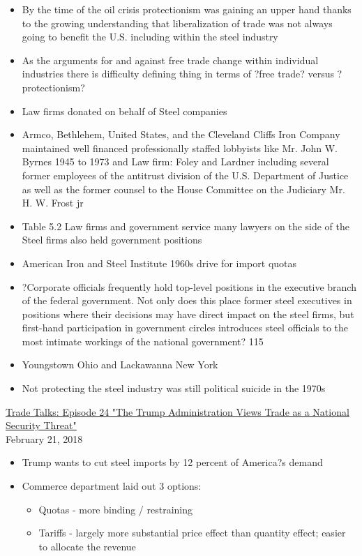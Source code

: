 \documentclass[10pt]{article}
\begin{document}
\begin{itemize}
\begin{itemize}
  \item By the time of the oil crisis protectionism was gaining an upper hand thanks to the growing understanding that liberalization of trade was not always going to benefit the U.S. including within the steel industry
  \item As the arguments for and against free trade change within individual industries there is difficulty defining thing in terms of ?free trade? versus ?protectionism?
  \item Law firms donated on behalf of Steel companies 
  \item Armco, Bethlehem, United States, and the Cleveland Cliffs Iron Company maintained well financed professionally staffed lobbyists like Mr. John W. Byrnes 1945 to 1973 and Law firm: Foley and Lardner including several former employees of the antitrust division of the U.S. Department of Justice as well as the former counsel to the House Committee on the Judiciary Mr. H. W. Frost jr
  \item Table 5.2 Law firms and government service many lawyers on the side of the Steel firms also held government positions 
  \item American Iron and Steel Institute 1960s drive for import quotas 
  \item ?Corporate officials frequently hold top-level positions in the executive branch of the federal government. Not only does this place former steel executives in positions where their decisions may have direct impact on the steel firms, but first-hand participation in government circles introduces steel officials to the most intimate workings of the national government? 115
  \item Youngstown Ohio and Lackawanna New York
  \item Not protecting the steel industry was still political suicide in the 1970s
\end{itemize}
\normalsize\underline{Trade Talks: Episode 24 "The Trump Administration Views Trade as a National Security Threat"}\\
\normalsize February 21, 2018
\begin{itemize}
  \item Trump wants to cut steel imports by 12 percent of America?s demand 
  \item Commerce department laid out 3 options:
\begin{itemize}
\item Quotas - more binding / restraining
\item Tariffs - largely more substantial price effect than quantity effect; easier to allocate the revenue 

\end{itemize}
\end{itemize}
\end{itemize}
\end{document}
